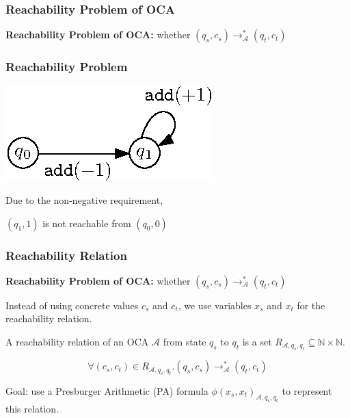 \documentclass[11pt]{beamer}
\begin{document}
\begin{frame}\frametitle{Reachability Problem of OCA}

\textbf{Reachability Problem of OCA: } whether $(q_s, c_s)\rightarrow^*_{\mathcal{A}} (q_t, c_t)$
\pause
\begin{example}\frametitle{Reachability Problem} 
\begin{center}
\includegraphics[scale=1]{reachexample2.eps}

\end{center}
Due to the non-negative requirement,

$(q_1, 1)$ is not reachable from $(q_0, 0)$




\end{example}
\end{frame}

\begin{frame}\frametitle{Reachability Relation}

\textbf{Reachability Problem of OCA: } whether $(q_s, c_s)\rightarrow^*_{\mathcal{A}} (q_t, c_t)$

Instead of using concrete values $c_s$ and $ c_t$, we use variables $x_s$ and $x_t$ for the reachability relation.
\pause

\begin{definition}
A reachability relation of an OCA $\mathcal{A}$ from state $q_s$ to $q_t$ is a set $R_{\mathcal{A}, q_s, q_t} \subseteq \mathbb{N} \times \mathbb{N}$. 

\[\forall (c_s, c_t)\in R_{\mathcal{A}, q_s, q_t}. (q_s, c_s)\rightarrow^*_{\mathcal{A}} (q_t, c_t)\]
\end{definition}
\pause
Goal: use a Presburger Arithmetic (PA) formula $\phi(x_s, x_t)_{\mathcal{A}, q_s, q_t}$ to represent this relation.
\end{frame}
\end{document}
